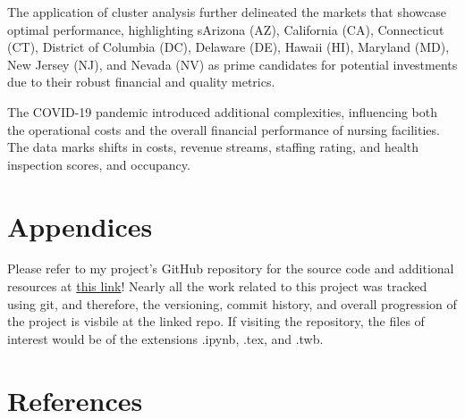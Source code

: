 \documentclass{article}
\theoremstyle{mytheoremstyle}
\theoremstyle{mytheoremstyle}
\theoremstyle{myproblemstyle}
\begin{document}
The application of cluster analysis further delineated the markets that showcase optimal performance, highlighting sArizona (AZ), California (CA), Connecticut (CT), District of Columbia (DC), Delaware (DE), Hawaii (HI), Maryland (MD), New Jersey (NJ), and Nevada (NV) as prime candidates for potential investments due to their robust financial and quality metrics. 

The COVID-19 pandemic introduced additional complexities, influencing both the operational costs and the overall financial performance of nursing facilities. The data marks shifts in costs, revenue streams, staffing rating, and health inspection scores, and occupancy.


\pagebreak
\section{Appendices}
Please refer to my project's GitHub repository for the source code and additional resources at \href{https://github.com/Musiik-fn/620-Project-Codebase}{this link}! Nearly all the work related to this project was tracked using git, and therefore, the versioning, commit history, and overall progression of the project is visbile at the linked repo. If visiting the repository, the files of interest would be of the extensions .ipynb, .tex, and .twb. 

\pagebreak
\section{References}
\end{document}
